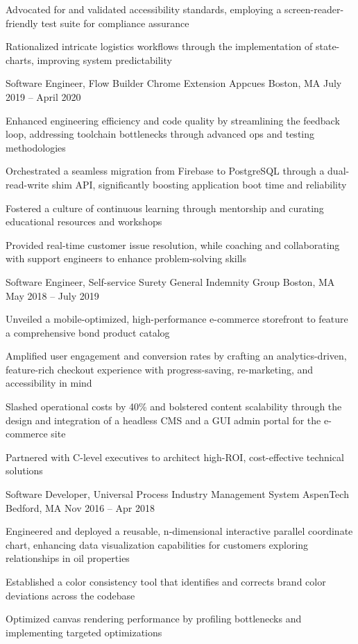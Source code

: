 \documentclass[]{awesome-cv}
\begin{document}
\begin{cventries}
{\begin{cvitems}
		\item {Advocated for and validated accessibility standards, employing a screen-reader-friendly test suite for compliance assurance}
		\item {Rationalized intricate logistics workflows through the implementation of state-charts, improving system predictability}
		\end{cvitems}}
	\cventry
	{Software Engineer, Flow Builder Chrome Extension}
	{Appcues}
	{Boston, MA}
	{July 2019 – April 2020}
	{\begin{cvitems}
		\item {Enhanced engineering efficiency and code quality by streamlining the feedback loop, addressing toolchain bottlenecks through advanced ops and testing methodologies}
		\item {Orchestrated a seamless migration from Firebase to PostgreSQL through a dual-read-write shim API, significantly boosting application boot time and reliability}
		\item {Fostered a culture of continuous learning through mentorship and curating educational resources and workshops}
		\item {Provided real-time customer issue resolution, while coaching and collaborating with support engineers to enhance problem-solving skills}
		\end{cvitems}}
	\cventry
	{Software Engineer, Self-service Surety}
	{General Indemnity Group}
	{Boston, MA}
	{May 2018 – July 2019}
	{\begin{cvitems}
		\item {Unveiled a mobile-optimized, high-performance e-commerce storefront to feature a comprehensive bond product catalog}
		\item {Amplified user engagement and conversion rates by crafting an analytics-driven, feature-rich checkout experience with progress-saving, re-marketing, and accessibility in mind}
		\item {Slashed operational costs by 40\% and bolstered content scalability through the design and integration of a headless CMS and a GUI admin portal for the e-commerce site}
		\item {Partnered with C-level executives to architect high-ROI, cost-effective technical solutions}
		\end{cvitems}}
	\cventry
	{Software Developer, Universal Process Industry Management System} 
	{AspenTech}
	{Bedford, MA}
	{Nov 2016 – Apr 2018}
	{\begin{cvitems}
		\item {Engineered and deployed a reusable, n-dimensional interactive parallel coordinate chart, enhancing data visualization capabilities for customers exploring relationships in oil properties}
		\item {Established a color consistency tool that identifies and corrects brand color deviations across the codebase}
		\item {Optimized canvas rendering performance by profiling bottlenecks and implementing targeted optimizations}
		\end{cvitems}}
\end{cventries}
\end{document}
